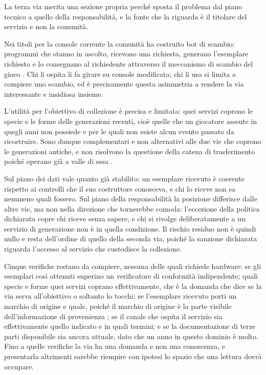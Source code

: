 La terza via merita una sezione propria perché sposta il problema dal piano tecnico a quello della responsabilità, e la fonte che la riguarda è il titolare del servizio e non la comunità.

Nei titoli per la console corrente la comunità ha costruito bot di scambio: programmi che stanno in ascolto, ricevono una richiesta, generano l'esemplare richiesto e lo consegnano al richiedente attraverso il meccanismo di scambio del gioco \cite{berichandev}. Chi li ospita li fa girare su console modificata; chi li usa si limita a compiere uno scambio, ed è precisamente questa asimmetria a rendere la via interessante e insidiosa insieme.

L'utilità per l'obiettivo di collezione è precisa e limitata: quei servizi coprono le specie e le forme delle generazioni recenti, cioè quelle che un giocatore assente in quegli anni non possiede e per le quali non esiste alcun evento passato da ricostruire. Sono dunque complementari e non alternativi alle due vie che coprono le generazioni antiche, e non risolvono la questione della catena di trasferimento poiché operano già a valle di essa \cite{amiibodoctor-generazione}.

Sul piano dei dati vale quanto già stabilito: un esemplare ricevuto è coerente rispetto ai controlli che il suo costruttore conosceva, e chi lo riceve non sa nemmeno quali fossero. Sul piano della responsabilità la posizione differisce dalle altre vie, ma non nella direzione che tornerebbe comoda: l'eccezione della politica dichiarata copre chi riceve senza sapere, e chi si rivolge deliberatamente a un servizio di generazione non è in quella condizione. Il rischio residuo non è quindi nullo e resta dell'ordine di quello della seconda via, poiché la sanzione dichiarata riguarda l'accesso al servizio che custodisce la collezione.

Cinque verifiche restano da compiere, nessuna delle quali richiede hardware: se gli esemplari così ottenuti superino un verificatore di conformità indipendente; quali specie e forme quei servizi coprano effettivamente, che è la domanda che dice se la via serva all'obiettivo o soltanto lo tocchi; se l'esemplare ricevuto porti un marchio di origine e quale, poiché il marchio di origine è la parte visibile dell'informazione di provenienza \cite{home-checklist}; se il canale che ospita il servizio sia effettivamente quello indicato e in quali termini; e se la documentazione di terze parti disponibile sia ancora attuale, dato che un anno in questo dominio è molto. Fino a quelle verifiche la via ha una domanda e non una conoscenza, e presentarla altrimenti sarebbe riempire con ipotesi lo spazio che una lettura dovrà occupare.

